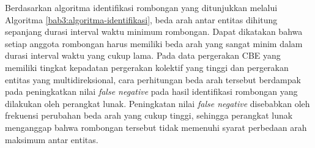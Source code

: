Berdasarkan algoritma identifikasi rombongan yang ditunjukkan melalui Algoritma \ref{bab3:algoritma-identifikasi}, beda arah antar entitas dihitung sepanjang durasi interval waktu minimum rombongan. Dapat dikatakan bahwa setiap anggota rombongan harus memiliki beda arah yang sangat minim dalam durasi interval waktu yang cukup lama. Pada data pergerakan CBE yang memiliki tingkat kepadatan pergerakan kolektif yang tinggi dan pergerakan entitas yang multidireksional, cara perhitungan beda arah tersebut berdampak pada peningkatkan nilai \textit{false negative} pada hasil identifikasi rombongan yang dilakukan oleh perangkat lunak. Peningkatan nilai \textit{false negative} disebabkan oleh frekuensi perubahan beda arah yang cukup tinggi, sehingga perangkat lunak menganggap bahwa rombongan tersebut tidak memenuhi syarat perbedaan arah maksimum antar entitas.